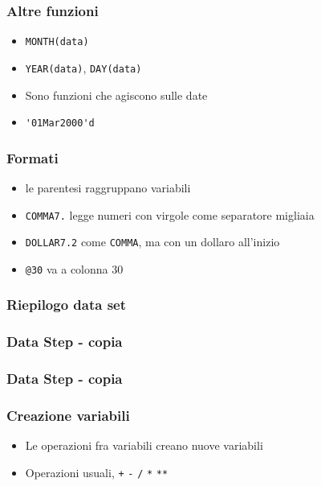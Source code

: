 \documentclass[12pt]{beamer}
\begin{document}
\begin{frame}[fragile]\frametitle{Altre funzioni}
  \begin{itemize}
  \item
    \verb!MONTH(data)!
  \item
    \verb!YEAR(data)!,  \verb!DAY(data)!
  \item
    Sono funzioni che agiscono sulle date
  \item
    \verb!'01Mar2000'd!
  \end{itemize}
\end{frame}



\begin{frame}[containsverbatim]\frametitle{Formati}

  \begin{itemize}
  \item
    le parentesi raggruppano variabili
  \item
    \verb!COMMA7.! legge numeri con virgole come separatore migliaia
  \item
    \verb!DOLLAR7.2! come \verb!COMMA!, ma con un dollaro all'inizio
  \item
    \verb!@30! va a colonna 30
  \end{itemize}
\end{frame}



\begin{frame}[containsverbatim]\frametitle{Riepilogo data set}
\end{frame}


\begin{frame}[fragile]\frametitle{Data Step - copia }
\end{frame}


\begin{frame}[fragile]\frametitle{Data Step - copia }
\end{frame}



\begin{frame}[fragile]\frametitle{Creazione variabili}

  \begin{itemize}
  \item
    Le operazioni fra variabili creano nuove variabili
  \item
    Operazioni usuali, \verb!+! \verb!-! \verb!/! \verb!*! \verb!**!
  \end{itemize}
\end{frame}
\end{document}
